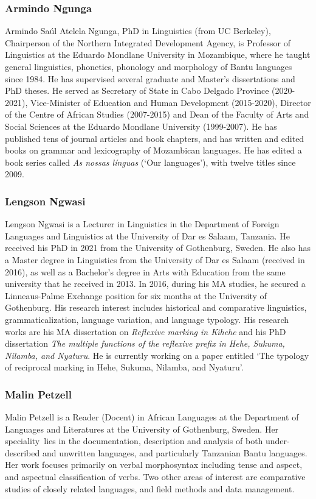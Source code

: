 \subsubsection*{Armindo Ngunga}
Armindo Saúl Atelela Ngunga, PhD in Linguistics (from UC Berkeley), Chairperson of the Northern Integrated Development Agency, is Professor of Linguistics at the Eduardo Mondlane University in Mozambique, where he taught general linguistics, phonetics, phonology and morphology of Bantu languages since 1984. He has supervised several graduate and Master's dissertations and PhD theses. He served as Secretary of State in Cabo Delgado Province (2020-2021), Vice-Minister of Education and Human Development (2015-2020), Director of the Centre of African Studies (2007-2015) and Dean of the Faculty of Arts and Social Sciences at the Eduardo Mondlane University (1999-2007). He has published tens of journal articles and book chapters, and has written and edited books on grammar and lexicography of Mozambican languages. He has edited a book series called \textit{As nossas línguas} (‘Our languages’), with twelve titles since 2009.

\subsubsection*{Lengson Ngwasi }
Lengson Ngwasi is a Lecturer in Linguistics in the Department of Foreign Languages and Linguistics at the University of Dar es Salaam, Tanzania. He received his PhD in 2021 from the University of Gothenburg, Sweden. He also has a Master degree in Linguistics from the University of Dar es Salaam (received in 2016), as well as a Bachelor's degree in Arts with Education from the same university that he received in 2013. {In 2016}, during his MA studies, he secured a Linneaus-Palme Exchange position for six months at the University of Gothenburg. His research interest includes historical and comparative linguistics, grammaticalization, language variation, and language typology. His research works are his MA dissertation on \textit{Reflexive marking in Kihehe} and his PhD dissertation \textit{The multiple functions of the reflexive prefix in Hehe, Sukuma, Nilamba, and Nyaturu}. He is currently working on a paper entitled ‘The typology of reciprocal marking in Hehe, Sukuma, Nilamba, and Nyaturu’.

\subsubsection*{Malin Petzell  }
Malin Petzell is a Reader (Docent) in African Languages at the Department of Languages and Literatures at the University of Gothenburg, Sweden. Her speciality{~}lies in the documentation, description and analysis of both under-described and unwritten languages, and particularly Tanzanian Bantu languages. Her work focuses primarily on verbal morphosyntax including tense and aspect, and aspectual classification of verbs. Two other areas of interest are comparative studies of closely related languages, and field methods and data management.

